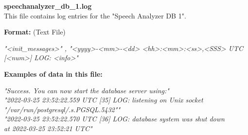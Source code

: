 \begin{description}
\begin{addmargin}[0em]{0em}
    \label{speechanalyzer_db_1.log}
    \begin{addmargin}[1em]{0em} %
        \textbf{speechanalyzer\_db\_1.log}\\
        This file contains log entries for the "Speech Analyzer DB 1".
        \begin{addmargin}[1em]{0em}
            \textbf{Format:} (Text File)
            \begin{addmargin}[1em]{0em}
                \textit{"<init\_messages>" , "<yyyy>-<mm>-<dd> <hh>:<mm>:<ss>,<SSS> UTC [<num>] LOG: <info>"}
            \end{addmargin}
        \end{addmargin}
        \begin{addmargin}[1em]{0em}
            \textbf{Examples of data in this file:}
            \begin{addmargin}[1em]{0em}\textit{"Success. You can now start the database server using:"\\
                "2022-03-25 23:52:22.559 UTC [35] LOG:  listening on Unix socket\\"/var/run/postgresql/.s.PGSQL.5432""\\
                "2022-03-25 23:52:22.570 UTC [36] LOG:  database system was shut down\\at 2022-03-25 23:52:21 UTC"}
            \end{addmargin}
        \end{addmargin}
    \end{addmargin} %
    \textbf{\\}


\end{addmargin}
\end{description}
